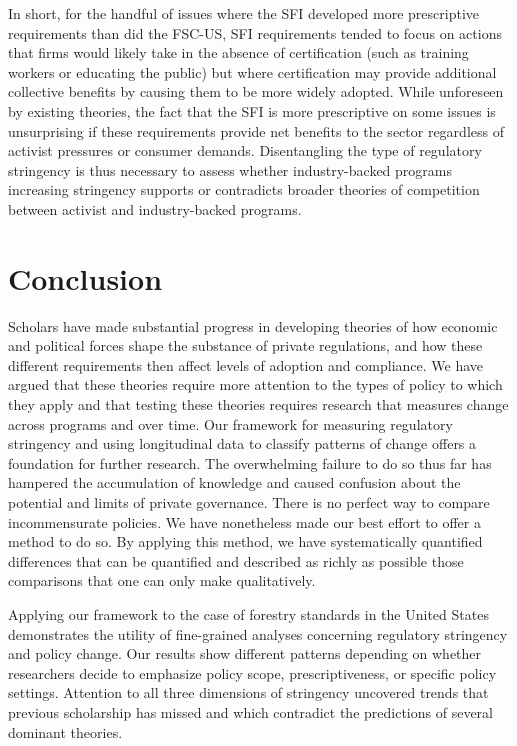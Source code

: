 \documentclass[
      12pt,
            Review ]{article}
\begin{document}
In short, for the handful of issues where the SFI developed more prescriptive requirements than did the FSC-US, SFI requirements tended to focus on actions that firms would likely take in the absence of certification (such as training workers or educating the public) but where certification may provide additional collective benefits by causing them to be more widely adopted. While unforeseen by existing theories, the fact that the SFI is more prescriptive on some issues is unsurprising if these requirements provide net benefits to the sector regardless of activist pressures or consumer demands. Disentangling the type of regulatory stringency is thus necessary to assess whether industry-backed programs increasing stringency supports or contradicts broader theories of competition between activist and industry-backed programs.

\hypertarget{conclusion}{%
\section{Conclusion}\label{conclusion}}

Scholars have made substantial progress in developing theories of how economic and political forces shape the substance of private regulations, and how these different requirements then affect levels of adoption and compliance. We have argued that these theories require more attention to the types of policy to which they apply and that testing these theories requires research that measures change across programs and over time. Our framework for measuring regulatory stringency and using longitudinal data to classify patterns of change offers a foundation for further research. The overwhelming failure to do so thus far has hampered the accumulation of knowledge and caused confusion about the potential and limits of private governance. There is no perfect way to compare incommensurate policies. We have nonetheless made our best effort to offer a method to do so. By applying this method, we have systematically quantified differences that can be quantified and described as richly as possible those comparisons that one can only make qualitatively.

Applying our framework to the case of forestry standards in the United States demonstrates the utility of fine-grained analyses concerning regulatory stringency and policy change. Our results show different patterns depending on whether researchers decide to emphasize policy scope, prescriptiveness, or specific policy settings. Attention to all three dimensions of stringency uncovered trends that previous scholarship has missed and which contradict the predictions of several dominant theories.
\end{document}
